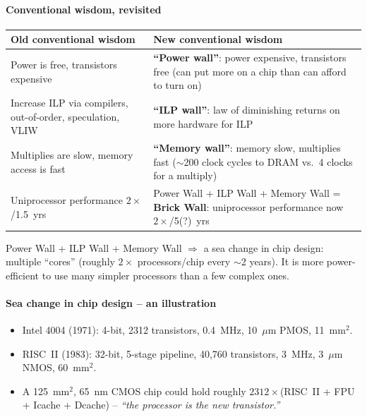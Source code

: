 \paragraph{Conventional wisdom, revisited}
\begin{center}
\begin{tabular}{@{}p{6.6cm}p{6.6cm}@{}}
\toprule
Old conventional wisdom & New conventional wisdom \\
\midrule
Power is free, transistors expensive &
\textbf{``Power wall''}: power expensive, transistors free (can put more on
a chip than can afford to turn on) \\
Increase ILP via compilers, out-of-order, speculation, VLIW &
\textbf{``ILP wall''}: law of diminishing returns on more hardware for ILP \\
Multiplies are slow, memory access is fast &
\textbf{``Memory wall''}: memory slow, multiplies fast ($\sim$200 clock
cycles to DRAM vs.\ 4 clocks for a multiply) \\
Uniprocessor performance $2\times$/1.5~yrs &
Power Wall + ILP Wall + Memory Wall = \textbf{Brick Wall}: uniprocessor
performance now $2\times$/5(?)~yrs \\
\bottomrule
\end{tabular}
\end{center}
\begin{note}
Power Wall + ILP Wall + Memory Wall $\Rightarrow$ a sea change in chip
design: multiple ``cores'' (roughly $2\times$ processors/chip every $\sim$2
years). It is more power-efficient to use many simpler processors than a few
complex ones.
\end{note}

\paragraph{Sea change in chip design -- an illustration}
\begin{itemize}
  \item Intel 4004 (1971): 4-bit, 2312 transistors, 0.4~MHz, 10~$\mu$m PMOS,
  11~mm$^2$.
  \item RISC~II (1983): 32-bit, 5-stage pipeline, 40{,}760 transistors,
  3~MHz, 3~$\mu$m NMOS, 60~mm$^2$.
  \item A 125~mm$^2$, 65~nm CMOS chip could hold roughly
  $2312\times$(RISC~II + FPU + Icache + Dcache) -- \emph{``the processor is
  the new transistor.''}
\end{itemize}

